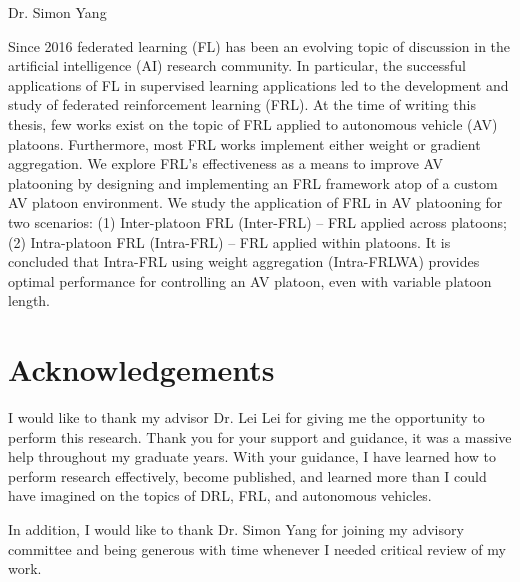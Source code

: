 \documentclass[oneside, 12pt]{book}
\begin{document}
									   \hfill Dr. Simon Yang \hspace{0.15cm}
\vspace{12pt}

Since 2016 federated learning (FL) has been an evolving topic of discussion in the artificial
intelligence (AI) research community.  In particular, the successful applications of FL
in supervised learning applications led to the development and study of
federated reinforcement learning (FRL).  At the time of writing this thesis,
few works exist on the topic of FRL applied to
autonomous vehicle (AV) platoons. Furthermore, most FRL works implement either weight or gradient aggregation.  We explore
FRL's effectiveness as a means to improve AV platooning by designing and implementing
an FRL framework atop of a custom AV platoon environment. We study the application of FRL in
AV platooning for two scenarios: (1) Inter-platoon FRL (Inter-FRL) -- FRL applied across platoons;
(2) Intra-platoon FRL (Intra-FRL) -- FRL applied within platoons. It is concluded that Intra-FRL using weight aggregation
(Intra-FRLWA) provides optimal performance for controlling an AV platoon, even with variable platoon length.

\chapter*{Acknowledgements}
\pagestyle{plain} %
I would like to thank my advisor Dr. Lei Lei for giving me the opportunity to perform this research.
Thank you for your support and guidance, it was a massive help throughout my graduate years.  With your guidance,
I have learned how to perform research effectively, become published, and learned more than I could have imagined on
the topics of DRL, FRL, and autonomous vehicles.

In addition, I would like to thank Dr. Simon Yang for joining my advisory committee and being
generous with time whenever I needed critical review of my work.
\newpage
{}
{}
\tableofcontents
\newpage
{}
{}
\listoftables
\newpage
{}
{}
\listoffigures
\newpage
\end{document}
